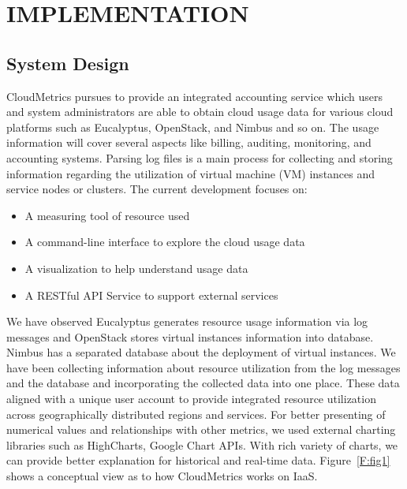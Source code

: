\documentclass{sig-alternate-05-2015}
\begin{document}
\section{IMPLEMENTATION} \label{S:implementation}

\subsection{System Design} \label{S:design}

CloudMetrics pursues to provide an integrated accounting service which users and system administrators are able to obtain cloud usage data for various cloud platforms such as Eucalyptus, OpenStack, and Nimbus and so on. The usage information will cover several aspects like billing, auditing, monitoring, and accounting systems. Parsing log files is a main process for collecting and storing information regarding the utilization of virtual machine (VM) instances and service nodes or clusters. The current development focuses on:

\begin{itemize}
 \item A measuring tool of resource used
 \item A command-line interface to explore the cloud usage data
 \item A visualization to help understand usage data
 \item A RESTful API Service to support external services
\end{itemize}

We have observed Eucalyptus generates resource usage information via log messages and OpenStack stores virtual instances information into database. Nimbus has a separated database about the deployment of virtual instances. We have been collecting information about resource utilization from the log messages and the database and incorporating the collected data into one place. These data aligned with a unique user account to provide integrated resource utilization across geographically distributed regions and services. For better presenting of numerical values and relationships with other metrics, we used external charting libraries such as HighCharts, Google Chart APIs. With rich variety of charts, we can provide better explanation for historical and real-time data. Figure~\ref{F:fig1} shows a conceptual view as to how CloudMetrics works on IaaS.
\end{document}
